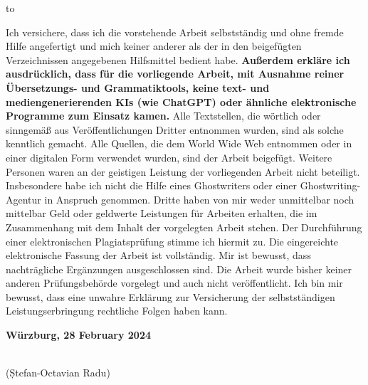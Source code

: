 \documentclass[runningheads,a4paper]{uwsese}
\newcommand{\authorName}{Ștefan-Octavian Radu}
\newcommand{\place}{Würzburg}
\newcommand{\submissionTime}{28 February 2024}
\begin{document}
\newpage




\clearpage
\hbox to \textwidth{\hrulefill}
\par

\noindent Ich versichere, dass ich die vorstehende Arbeit selbstständig und ohne fremde Hilfe angefertigt und mich keiner anderer als der in den beigefügten Verzeichnissen angegebenen Hilfsmittel bedient habe.
\textbf{Außerdem erkläre ich ausdrücklich, dass für die vorliegende Arbeit, mit Ausnahme reiner Übersetzungs- und Grammatiktools, keine text- und mediengenerierenden KIs (wie ChatGPT) oder ähnliche elektronische Programme zum Einsatz kamen.}
Alle Textstellen, die wörtlich oder sinngemäß aus Veröffentlichungen Dritter entnommen wurden, sind als solche kenntlich gemacht.
Alle Quellen, die dem World Wide Web entnommen oder in einer digitalen Form verwendet wurden, sind der Arbeit beigefügt.
\bigbreak
\noindent Weitere Personen waren an der geistigen Leistung der vorliegenden Arbeit nicht beteiligt.
Insbesondere habe ich nicht die Hilfe eines Ghostwriters oder einer Ghostwriting-Agentur in Anspruch genommen.
Dritte haben von mir weder unmittelbar noch mittelbar Geld oder geldwerte Leistungen für Arbeiten erhalten, die im Zusammenhang mit dem Inhalt der vorgelegten Arbeit stehen.
\bigbreak
\noindent Der Durchführung einer elektronischen Plagiatsprüfung stimme ich hiermit zu.
Die eingereichte elektronische Fassung der Arbeit ist vollständig.
Mir ist bewusst, dass nach\-träg\-li\-che Ergänzungen ausgeschlossen sind.
\bigbreak
\noindent Die Arbeit wurde bisher keiner anderen Prüfungsbehörde vorgelegt und auch nicht veröffentlicht.
Ich bin mir bewusst, dass eine unwahre Erklärung zur Versicherung der selbstständigen Leistungserbringung rechtliche Folgen haben kann.

\vspace*{2\baselineskip}

\noindent\textbf{\place, \submissionTime}
\vspace{1.5cm}

\noindent\dotfill\hspace*{8.0cm}\\
\noindent\hspace*{2cm}(\authorName) %


\thispagestyle{empty}
\end{document}
